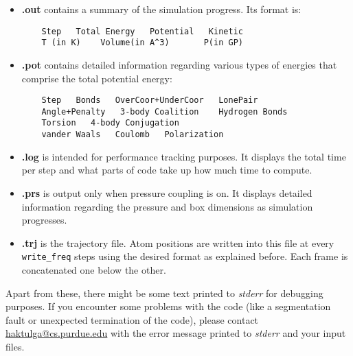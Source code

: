 \documentclass{article}
\begin{document}
\begin{itemize}
  \item{\textbf{.out}} contains a summary of the simulation progress. 
    Its format is:
    \begin{verbatim}
    Step   Total Energy   Potential   Kinetic   
    T (in K)    Volume(in A^3)       P(in GP)
  \end{verbatim}

\item{\textbf{.pot}} contains detailed information regarding various types of
  energies that comprise the total potential energy:
    \begin{verbatim}
    Step   Bonds   OverCoor+UnderCoor   LonePair   
    Angle+Penalty   3-body Coalition    Hydrogen Bonds  
    Torsion   4-body Conjugation   
    vander Waals   Coulomb   Polarization
  \end{verbatim}

\item{\textbf{.log}} is intended for performance tracking purposes. 
  It displays the total time per step and what parts of code take 
    up how much time to compute.

  \item{\textbf{.prs}} is output only when pressure coupling is on. 
    It displays detailed information regarding the pressure and 
    box dimensions as simulation progresses.

  \item{\textbf{.trj}} is the trajectory file. Atom positions are written 
    into this file at every {\tt write\_freq} steps using the desired format 
    as explained before. Each frame is concatenated one below the other.

\end{itemize}

Apart from these, there might be some text printed to \emph{stderr} 
for debugging purposes. If you encounter some problems with the code
(like a segmentation fault or unexpected termination of the code),
please contact \href{mailto:haktulga@cs.purdue.edu}{haktulga@cs.purdue.edu} with the error message 
printed to \emph{stderr} and your input files.
\end{document}
